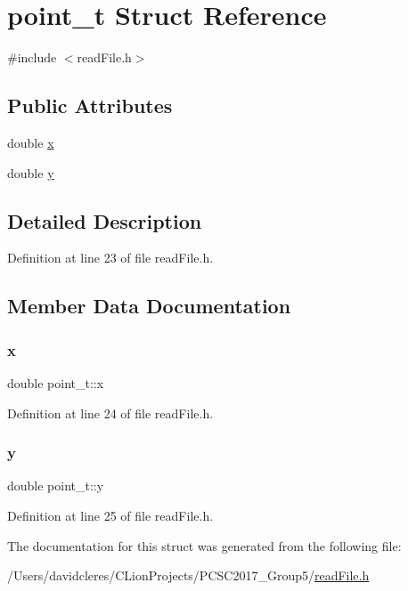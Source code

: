 \hypertarget{structpoint__t}{}\section{point\+\_\+t Struct Reference}
\label{structpoint__t}


{\ttfamily \#include $<$read\+File.\+h$>$}

\subsection*{Public Attributes}
\begin{DoxyCompactItemize}
\item 
double \mbox{\hyperlink{structpoint__t_acf7556ca44360564040f5c86257b55b1}{x}}
\item 
double \mbox{\hyperlink{structpoint__t_a8590af4986d0e4ef2b6756946f80438c}{y}}
\end{DoxyCompactItemize}


\subsection{Detailed Description}


Definition at line 23 of file read\+File.\+h.



\subsection{Member Data Documentation}
\mbox{\label{structpoint__t_acf7556ca44360564040f5c86257b55b1}} 
\subsubsection{\texorpdfstring{x}{x}}
{\footnotesize\ttfamily double point\+\_\+t\+::x}



Definition at line 24 of file read\+File.\+h.

\mbox{\label{structpoint__t_a8590af4986d0e4ef2b6756946f80438c}} 
\subsubsection{\texorpdfstring{y}{y}}
{\footnotesize\ttfamily double point\+\_\+t\+::y}



Definition at line 25 of file read\+File.\+h.



The documentation for this struct was generated from the following file\+:\begin{DoxyCompactItemize}
\item 
/\+Users/davidcleres/\+C\+Lion\+Projects/\+P\+C\+S\+C2017\+\_\+\+Group5/\mbox{\hyperlink{read_file_8h}{read\+File.\+h}}\end{DoxyCompactItemize}
